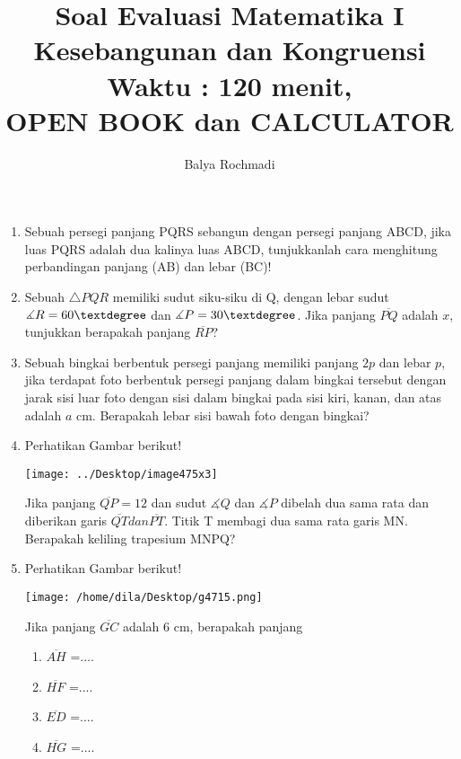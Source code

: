 \documentclass[12pt,a4paper]{article}
\author{Balya Rochmadi}
\title{\huge{Soal Evaluasi Matematika I\\ Kesebangunan dan Kongruensi\\ \large{Waktu : 120 menit, \\ \textbf{OPEN BOOK dan CALCULATOR}}}}
\begin{document}
	\maketitle
	\begin{enumerate}
		\item Sebuah persegi panjang PQRS sebangun dengan persegi panjang ABCD, jika luas PQRS adalah dua kalinya luas ABCD, tunjukkanlah cara menghitung perbandingan panjang (AB) dan lebar (BC)!
		\item  Sebuah $\triangle PQR$ memiliki sudut siku-siku di Q, dengan lebar sudut $\measuredangle R = 60\textdegree$ dan $\measuredangle P = 30\textdegree$. Jika panjang $\overline{PQ}$ adalah $x$, tunjukkan berapakah panjang $\overline{RP}$?
		\item Sebuah bingkai berbentuk persegi panjang memiliki panjang $2p$ dan lebar $p$, jika terdapat foto berbentuk persegi panjang dalam bingkai tersebut dengan jarak sisi luar foto dengan sisi dalam bingkai pada sisi kiri, kanan, dan atas adalah $a$ cm. Berapakah lebar sisi bawah foto dengan bingkai?
		\item Perhatikan Gambar berikut!	
\begin{center}
\texttt{[image: ../Desktop/image475x3]}
\end{center}
		Jika panjang $\overline{QP}=12$ dan sudut $\measuredangle Q $ dan $\measuredangle P $ dibelah dua sama rata dan diberikan garis $\overline{QT} dan \overline{PT}$. Titik T membagi dua sama rata garis MN. Berapakah keliling trapesium MNPQ? 
		\item Perhatikan Gambar berikut!\\
		\begin{center}
			\texttt{[image: /home/dila/Desktop/g4715.png]}\\ 
		\end{center}
		Jika panjang $\overline{GC}$ adalah 6 cm, berapakah panjang 
		\begin{enumerate}
			\item $\overline{AH}$ =....
			\item $\overline{HF}$ =....
			\item $\overline{ED}$ =....
			\item $\overline{HG}$ =....
		\end{enumerate}



\end{enumerate}
\end{document}
